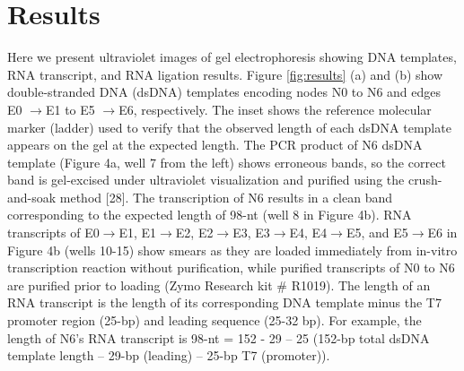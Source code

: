 
\usepackage{geometry} %
\usepackage[table]{xcolor} %
\usepackage{array}
\usepackage{lmodern}
\usepackage{multirow, booktabs} %

\section{Results} \label{sec:results}
			Here we present ultraviolet images of gel electrophoresis showing DNA templates, RNA transcript, and RNA ligation results. 
			Figure \ref{fig:results}  (a) and (b) show double-stranded DNA (dsDNA) templates encoding nodes N0 to N6 and 
			edges E0 $\rightarrow$E1 to E5 $\rightarrow$E6, respectively.  The inset shows the reference molecular marker (ladder) 
			used to verify that the observed length of each dsDNA template appears on the gel at the expected length. The PCR product of 
			N6 dsDNA template (Figure 4a, well 7 from the left) shows erroneous bands, so the correct band is gel-excised under ultraviolet 
			visualization and purified using the crush-and-soak method [28]. The transcription of N6 results in a clean band corresponding 
			to the expected length of 98-nt (well 8 in Figure 4b). RNA transcripts of E0$\rightarrow$E1, E1$\rightarrow$E2, E2$\rightarrow$E3, 
			E3$\rightarrow$E4, E4$\rightarrow$E5, and E5$\rightarrow$E6 in Figure 4b (wells 10-15) show smears as they are loaded immediately 
			from in-vitro transcription reaction without purification, while purified transcripts of N0 to N6  are purified prior to loading 
			(Zymo Research kit \# R1019). The length of an RNA transcript is the length of its corresponding DNA template minus the T7 
			promoter region (25-bp) and leading sequence (25-32 bp). For example, the length of N6’s RNA transcript 
			is 98-nt = 152 - 29 – 25 (152-bp total dsDNA template length – 29-bp (leading) –  25-bp T7 (promoter)).
